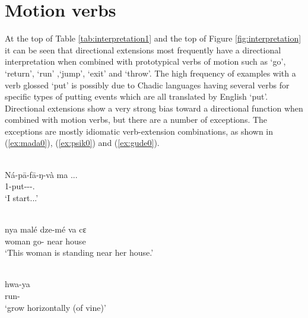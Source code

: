 \section{Motion verbs} \label{sec:interpretingmotion}

At the top of Table \ref{tab:interpretation1} and the top of Figure \ref{fig:interpretation} it can be seen that directional extensions most frequently have a directional interpretation when combined with prototypical verbs of motion such as `go', `return', `run' ,`jump', `exit' and `throw'. The high frequency of examples with a verb glossed `put' is possibly due to Chadic languages having several verbs for specific types of putting events which are all translated by English `put'. Directional extensions show a very strong bias toward a directional function when combined with motion verbs, but there are a number of exceptions. The exceptions are mostly idiomatic verb-extension combinations, as shown in (\ref{ex:mada0}), (\ref{ex:psik0}) and (\ref{ex:gude0}).  

\ea\label{ex:mada0}
 \\
\gll Ná-pā-fā-ŋ-và ma ...	\\
1-put---. 	\\
\glt `I start...'

\ex\label{ex:psik0}
 \\
\gll nya malé dze-mé va cɛ	\\
 woman go- near house \\
\glt `This woman is standing near her house.'

\ex\label{ex:gude0}
 \\
\gll hwa-ya	\\ 
run-	\\ 
\glt `grow horizontally (of vine)'
\z 

